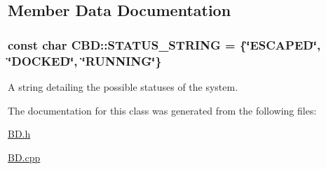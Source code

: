 \subsection{Member Data Documentation}
\hypertarget{classCBD_a20beab0b7b100a3d5baf2b3924453641}{
\subsubsection[{S\-T\-A\-T\-U\-S\-\_\-\-S\-T\-R\-I\-N\-G}]{\setlength{\rightskip}{0pt plus 5cm}const char C\-B\-D\-::\-S\-T\-A\-T\-U\-S\-\_\-\-S\-T\-R\-I\-N\-G = \{\char`\"{}E\-S\-C\-A\-P\-E\-D\char`\"{}, \char`\"{}{\bf D\-O\-C\-K\-E\-D}\char`\"{}, \char`\"{}{\bf R\-U\-N\-N\-I\-N\-G}\char`\"{}\}\hspace{0.3cm}{\ttfamily [static]}}}\label{classCBD_a20beab0b7b100a3d5baf2b3924453641}


A string detailing the possible statuses of the system. 



The documentation for this class was generated from the following files\-:\begin{DoxyCompactItemize}
\item 
\hyperlink{BD_8h}{B\-D.\-h}\item 
\hyperlink{BD_8cpp}{B\-D.\-cpp}\end{DoxyCompactItemize}
